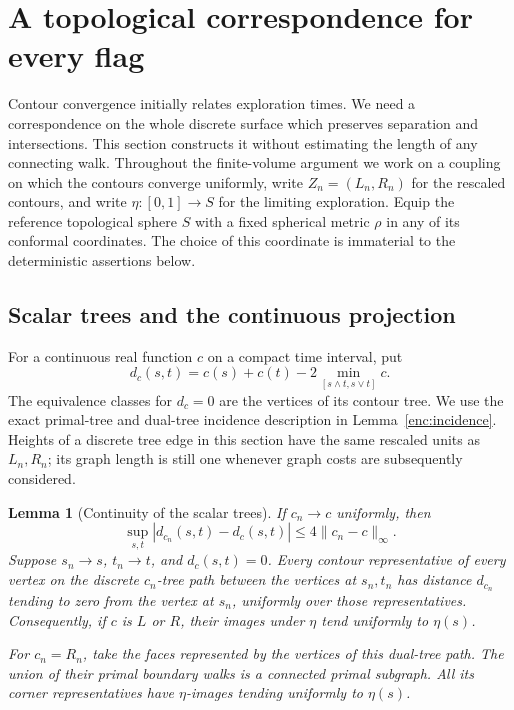 \documentclass[11pt]{article}
\numberwithin{equation}{section}
\newtheorem{lemma}[theorem]{Lemma}
\theoremstyle{definition}
\theoremstyle{remark}
\newcommand{\1}{\mathbf 1}
\begin{document}
\section{A topological correspondence for every flag}
\label{top:section}

Contour convergence initially relates exploration times.  We need a
correspondence on the whole discrete surface which preserves separation
and intersections.  This section constructs it without estimating the
length of any connecting walk.  Throughout the finite-volume argument we
work on a coupling on which the contours converge uniformly, write
$Z_n=(L_n,R_n)$ for the rescaled contours, and write
$\eta:[0,1]\to S$ for the limiting exploration.  Equip the reference
topological sphere $S$ with a fixed spherical metric $\rho$ in any of its
conformal coordinates.  The choice of this coordinate is immaterial to
the deterministic assertions below.

\subsection{Scalar trees and the continuous projection}

For a continuous real function $c$ on a compact time interval, put
\begin{equation}\label{top:tree-pseudometric}
 d_c(s,t)=c(s)+c(t)-2\min_{[s\wedge t,s\vee t]}c.
\end{equation}
The equivalence classes for $d_c=0$ are the vertices of its contour tree.
We use the exact primal-tree and dual-tree incidence description in
Lemma~\ref{enc:incidence}.  Heights of a discrete tree edge in this
section have the same rescaled units as $L_n,R_n$; its graph length is
still one whenever graph costs are subsequently considered.

\begin{lemma}[Continuity of the scalar trees]\label{top:scalar-trees}
If $c_n\to c$ uniformly, then
\[
 \sup_{s,t}|d_{c_n}(s,t)-d_c(s,t)|
 \le 4\|c_n-c\|_\infty.
\]
Suppose $s_n\to s$, $t_n\to t$, and $d_c(s,t)=0$.
Every contour representative of every vertex on the discrete
$c_n$-tree path between the vertices at $s_n,t_n$ has distance
$d_{c_n}$ tending to zero from the vertex at $s_n$, uniformly over those
representatives.  Consequently, if $c$ is $L$ or $R$, their images under
$\eta$ tend uniformly to $\eta(s)$.

For $c_n=R_n$, take the faces represented by the vertices of this
dual-tree path.  The union of their primal boundary walks is a connected
primal subgraph.  All its corner representatives have $\eta$-images
tending uniformly to $\eta(s)$.
\end{lemma}
\end{document}
